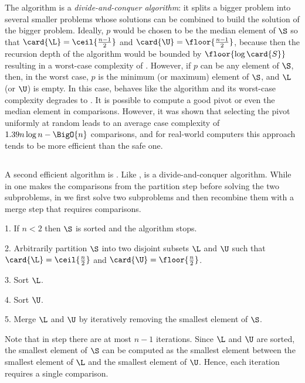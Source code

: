 The \quicksort algorithm is a \emph{divide-and-conquer algorithm}: it splits a bigger
problem into several smaller problems whose solutions can be combined to build
the solution of the bigger problem. Ideally, \(p\) would be chosen to be the
median element of \(\S\) so that \(\card{\L} = \ceil{\frac{n-1}{2}}\) and
\(\card{\U} = \floor{\frac{n-1}{2}}\), because then the recursion depth of the
algorithm would be bounded by \(\floor{\log \card{S}}\) resulting in a
worst-case complexity of . However, if \(p\) can be any element
of \(\S\), then, in the worst case, \(p\) is the minimum (or maximum) element of
\(\S\), and \(\L\) (or \(\U\)) is empty. In this case, \quicksort behaves like
the \selectionsort algorithm and its worst-case complexity degrades to
. It is possible \cite{blum:1973} to compute a good pivot or even the
median element in  comparisons. However, it was shown \cite{hoare:1962}
that selecting the pivot uniformly at random leads to an average case
complexity of \(1.39n \log n - \BigO{n}\) comparisons, and for real-world computers this
approach tends to be more efficient than the safe one.

\subsection{\mergesort}
A second efficient algorithm is \mergesort
\cite{goldstine:1948,leiserson:2001}. Like \quicksort, \mergesort is a
divide-and-conquer algorithm. While in \quicksort one makes the comparisons from
the partition step before solving the two subproblems, in \mergesort we
first solve two subproblems and then recombine them with a merge step that
requires  comparisons.
\begin{algorithm}[\mergesort]
\item[1.] If \(n < 2\) then \(\S\) is sorted and the algorithm stops.
\item[2.] Arbitrarily partition \(\S\) into two disjoint subsets \(\L\) and
\(\U\) such that \(\card{\L} = \ceil{\frac{n}{2}}\) and \(\card{\U} =
\floor{\frac{n}{2}}\).
\item[3.] Sort \(\L\).
\item[4.] Sort \(\U\).
\item[5.] Merge \(\L\) and \(\U\) by iteratively removing the smallest element
of \(\S\).
\end{algorithm}

Note that in step  there are at most \(n - 1\) iterations. Since \(\L\)
and \(\U\) are sorted, the smallest element of \(\S\) can be computed as the
smallest element between the smallest element of \(\L\) and the smallest
element of \(\U\). Hence, each iteration requires a single comparison.

